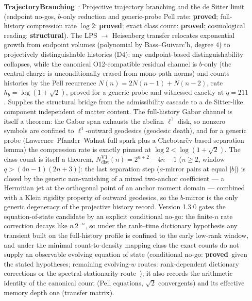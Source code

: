 \documentclass[11pt,a4paper]{article}
\newcommand{\sproved}{\textcolor{cproved}{\textbf{proved}}}
\newcommand{\sstruct}{\textcolor{cstruct}{\textbf{structural}}}
\begin{document}
    \textbf{TrajectoryBranching}~\cite{Beau2026tb}: Projective trajectory branching and the de Sitter limit
    (endpoint no-gos, $b$-only reduction and generic-probe Pell rate: \sproved; full-history compression rate
    $\log 2$: \sproved; exact class count: \sproved; cosmological reading: \sstruct).
    The LPS $\to$ Heisenberg transfer relocates exponential growth from endpoint volumes (polynomial by
    Bass--Guivarc'h, degree $4$) to projectively distinguishable histories (D4): any endpoint-based
    distinguishability collapses, while the canonical O12-compatible residual channel is $b$-only (the central
    charge is unconditionally erased from mono-path norms) and counts histories by the Pell recurrence
    $N(n) = 2N(n-1) + N(n-2)$, rate $h_b = \log(1+\sqrt2)$, proved for a generic probe and witnessed exactly at
    $q=211$.
    Supplies the structural bridge from the admissibility cascade to a de Sitter-like component independent of
    matter content.
    The full-history Gabor channel is itself a theorem: the Gabor span exhausts the abelian
    $\ell^1$ disk, so nonzero symbols are confined to $\ell^1$-outward geodesics (geodesic death), and for a
    generic probe (Lawrence--Pfander--Walnut full spark plus a Chebotar\"ev-based separation lemma) the
    compression rate is exactly pinned at $\log 2 < \log(1+\sqrt2)$.
    The class count is itself a theorem,
    $N^{\mathrm{V3}}_{\mathrm{dist}}(n) = 2^{n+2}-4n-1$ ($n \ge 2$, window $q > (4n-1)(2n+3)$): the last
    separation step ($a$-mirror pairs at equal $|b|$) is closed by the generic non-vanishing of a mixed
    two-anchor coefficient --- a Hermitian jet at the orthogonal point of an anchor moment domain --- combined
    with a Klein rigidity property of outward geodesics, so the $b$-mirror is the only generic degeneracy of
    the projective history record.
    Version 1.3.0 gates the equation-of-state candidate by an explicit conditional no-go: the finite-$n$ rate
    correction decays like $n\,2^{-n}$, so under the rank--time dictionary hypothesis any transient built on
    the full-history profile is confined to the early low-rank window, and under the minimal count-to-density
    mapping class the exact counts do not supply an observable evolving equation of state (conditional no-go:
    \sproved\ given the stated hypotheses; remaining evolving-$w$ routes: rank-dependent dictionary
    corrections or the spectral-stationarity route~\cite{Beau2026Thermodynamics}); it also records the
    arithmetic identity of the canonical count (Pell equations, $\sqrt2$ convergents) and its effective memory
    depth one (transfer matrix).
\end{document}
